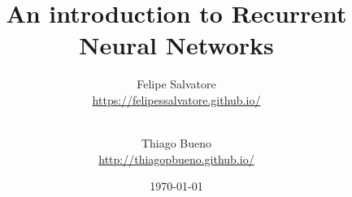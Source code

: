 \title{An introduction to Recurrent Neural Networks}
\date{\today}

\author{
  Felipe Salvatore\\
  \url{https://felipessalvatore.github.io/}
  \vspace{0.4 cm}
  \and\\ 
  Thiago Bueno\\
  \url{http://thiagopbueno.github.io/}\\\vspace{0.4 cm}
}

